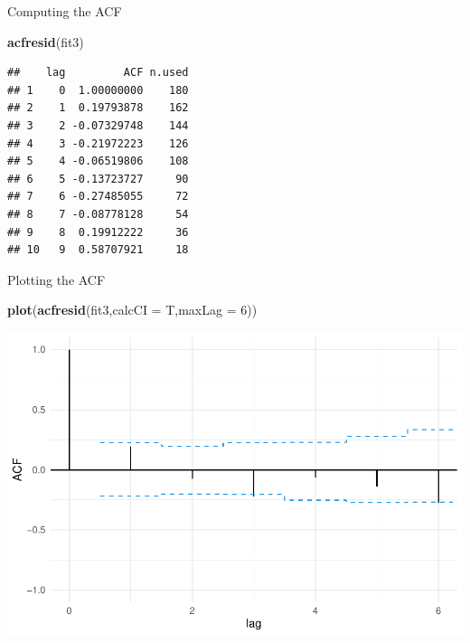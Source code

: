 \documentclass[
  ignorenonframetext,
]{beamer}
\newenvironment{Shaded}{\begin{snugshade}}{\end{snugshade}}
\newcommand{\DataTypeTok}[1]{\textcolor[rgb]{0.13,0.29,0.53}{#1}}
\newcommand{\DecValTok}[1]{\textcolor[rgb]{0.00,0.00,0.81}{#1}}
\newcommand{\KeywordTok}[1]{\textcolor[rgb]{0.13,0.29,0.53}{\textbf{#1}}}
\newcommand{\NormalTok}[1]{#1}
\begin{document}
\begin{frame}[fragile]{Computing the ACF}
\protect\hypertarget{computing-the-acf}{}

\begin{Shaded}
\begin{Highlighting}[]
\KeywordTok{acfresid}\NormalTok{(fit3)}
\end{Highlighting}
\end{Shaded}

\begin{verbatim}
##    lag         ACF n.used
## 1    0  1.00000000    180
## 2    1  0.19793878    162
## 3    2 -0.07329748    144
## 4    3 -0.21972223    126
## 5    4 -0.06519806    108
## 6    5 -0.13723727     90
## 7    6 -0.27485055     72
## 8    7 -0.08778128     54
## 9    8  0.19912222     36
## 10   9  0.58707921     18
\end{verbatim}

\end{frame}

\begin{frame}[fragile]{Plotting the ACF}
\protect\hypertarget{plotting-the-acf}{}

\begin{Shaded}
\begin{Highlighting}[]
\KeywordTok{plot}\NormalTok{(}\KeywordTok{acfresid}\NormalTok{(fit3,}\DataTypeTok{calcCI =}\NormalTok{ T,}\DataTypeTok{maxLag =} \DecValTok{6}\NormalTok{))}
\end{Highlighting}
\end{Shaded}

\begin{center}\includegraphics[width=0.85\linewidth]{codes_files/figure-beamer/fit6-1} \end{center}

\end{frame}
\end{document}
